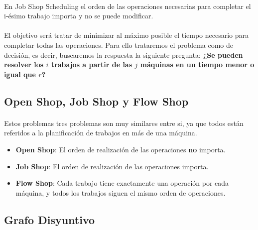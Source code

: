 \documentclass[11pt, a4paper,spanish]{article}
\begin{document}
				\paragraph{}
				En Job Shop Scheduling el orden de las operaciones necesarias para completar el i-ésimo trabajo importa y no se puede modificar.
			 
				\paragraph{}
				El objetivo será tratar de minimizar al máximo posible el tiempo necesario para completar todas las operaciones. Para ello trataremos el problema como de decisión, es decir, buscaremos la respuesta la siguiente pregunta:  
				\newline
				{ \bf ¿Se pueden resolver los $i$ trabajos a partir de las $j$ máquinas en un tiempo menor o igual que $r$?}
				
			\subsection{Open Shop, Job Shop y Flow Shop}
			
				\paragraph{}
				Estos problemas tres problemas son muy similares entre si, ya que todos están referidos a la planificación de trabajos en más de una máquina.
				
				\begin{itemize}
				
					\item {\bf Open Shop}: El orden de realización de las operaciones {\bf no} importa.
					
					\item {\bf Job Shop}: El orden de realización de las operaciones importa.
					
					\item {\bf Flow Shop}: Cada trabajo tiene exactamente una operación por cada máquina, y todos los trabajos siguen el mismo orden de operaciones.
					
				\end{itemize}
			
			\subsection{Grafo Disyuntivo}
			
\end{document}
